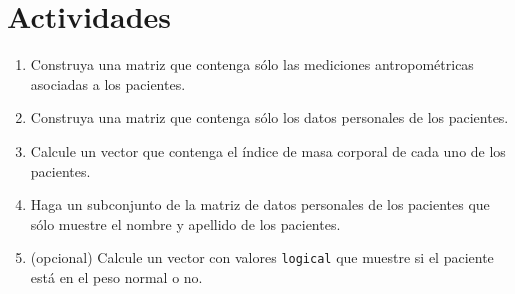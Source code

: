 \documentclass{article}
\begin{document}
\section{Actividades}

\begin{enumerate}
    \item Construya una matriz que contenga sólo las mediciones antropométricas asociadas a los pacientes.
    \item Construya una matriz que contenga sólo los datos personales de los pacientes.
    \item Calcule un vector que contenga el índice de masa corporal de cada uno de los pacientes.
    \item Haga un subconjunto de la matriz de datos personales de los pacientes que sólo muestre el nombre y apellido de los pacientes.
    \item (opcional) Calcule un vector con valores \texttt{logical} que muestre si el paciente está en el peso normal o no.
\end{enumerate}
\end{document}
